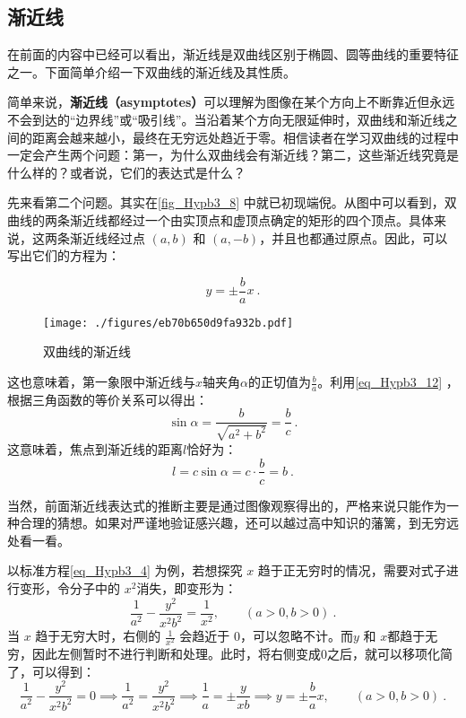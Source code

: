\subsection{渐近线}

在前面的内容中已经可以看出，渐近线是双曲线区别于椭圆、圆等曲线的重要特征之一。下面简单介绍一下双曲线的渐近线及其性质。

简单来说，\textbf{渐近线（asymptotes）}可以理解为图像在某个方向上不断靠近但永远不会到达的“边界线”或“吸引线”。当沿着某个方向无限延伸时，双曲线和渐近线之间的距离会越来越小，最终在无穷远处趋近于零。相信读者在学习双曲线的过程中一定会产生两个问题：第一，为什么双曲线会有渐近线？第二，这些渐近线究竟是什么样的？或者说，它们的表达式是什么？

先来看第二个问题。其实在\autoref{fig_Hypb3_8} 中就已初现端倪。从图中可以看到，双曲线的两条渐近线都经过一个由实顶点和虚顶点确定的矩形的四个顶点。具体来说，这两条渐近线经过点 $(a,b)$ 和 $(a,-b)$，并且也都通过原点。因此，可以写出它们的方程为：

\begin{equation}\label{eq_Hypb3_16}
y=\pm\frac{b}{a}x~.
\end{equation}

\begin{figure}[ht]
\centering
\texttt{[image: ./figures/eb70b650d9fa932b.pdf]}
\caption{双曲线的渐近线} \label{fig_Hypb3_1}
\end{figure}

这也意味着，第一象限中渐近线与$x$轴夹角$\alpha$的正切值为$\displaystyle\frac{b}{a}$。利用\autoref{eq_Hypb3_12} ，根据三角函数的等价关系可以得出：
\begin{equation}
\sin\alpha=\frac{b}{\sqrt{a^2+b^2}}=\frac{b}{c}~.
\end{equation}
这意味着，焦点到渐近线的距离$l$恰好为：
\begin{equation}\label{eq_Hypb3_11}
l=c\sin\alpha = c\cdot \frac{b}{c} = b~.
\end{equation}

当然，前面渐近线表达式的推断主要是通过图像观察得出的，严格来说只能作为一种合理的猜想。如果对严谨地验证感兴趣，还可以越过高中知识的藩篱，到无穷远处看一看。

以标准方程\autoref{eq_Hypb3_4} 为例，若想探究 $x$ 趋于正无穷时的情况，需要对式子进行变形，令分子中的 $x^2$消失，即变形为：
\begin{equation}
\frac{1}{a^2} - \frac{y^2}{x^2b^2} =  \frac{1}{x^2} ,\qquad(a>0,b>0)~.
\end{equation}
当 $x$ 趋于无穷大时，右侧的 $\displaystyle\frac{1}{x^2}$ 会趋近于 $0$，可以忽略不计。而$y$ 和 $x$都趋于无穷，因此左侧暂时不进行判断和处理。此时，将右侧变成$0$之后，就可以移项化简了，可以得到：
\begin{equation}\label{eq_Hypb3_18}
\frac{1}{a^2} - \frac{y^2}{x^2b^2} = 0 \implies\frac{1}{a^2} = \frac{y^2}{x^2b^2}\implies \frac{1}{a} = \pm\frac{y}{xb}\implies y=\pm\frac{b}{a}x,\qquad(a>0,b>0)~.
\end{equation}

